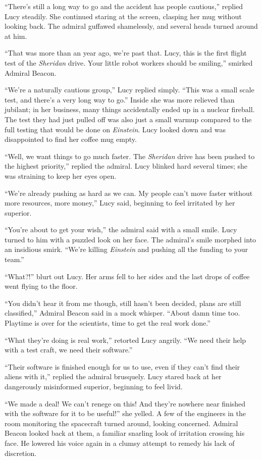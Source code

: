 \documentclass[12pt]{article} %
\begin{document}
``There's still a long way to go and the accident has people cautious,'' replied Lucy steadily. She continued staring at the screen, clasping her mug without looking back. The admiral guffawed shamelessly, and several heads turned around at him.

``That was more than an year ago, we're past that. Lucy, this is the first flight test of the \textit{Sheridan} drive. Your little robot workers should be smiling,'' smirked Admiral Beacon.

``We're a naturally cautious group,'' Lucy replied simply. ``This was a small scale test, and there's a very long way to go.'' Inside she was more relieved than jubilant; in her business, many things accidentally ended up in a nuclear fireball. The test they had just pulled off was also just a small warmup compared to the full testing that would be done on \textit{Einstein}. Lucy looked down and was disappointed to find her coffee mug empty.

``Well, we want things to go much faster. The \textit{Sheridan} drive has been pushed to the highest priority,'' replied the admiral. Lucy blinked hard several times; she was straining to keep her eyes open.

``We're already pushing as hard as we can. My people can't move faster without more resources, more money,'' Lucy said, beginning to feel irritated by her superior.

``You're about to get your wish,'' the admiral said with a small smile. Lucy turned to him with a puzzled look on her face. The admiral's smile morphed into an insidious smirk. ``We're killing \textit{Einstein} and pushing all the funding to your team.''

``What?!'' blurt out Lucy. Her arms fell to her sides and the last drops of coffee went flying to the floor.

``You didn't hear it from me though, still hasn't been decided, plans are still classified,'' Admiral Beacon said in a mock whisper. ``About damn time too. Playtime is over for the scientists, time to get the real work done.''

``What they're doing is real work,'' retorted Lucy angrily. ``We need their help with a test craft, we need their software.''

``Their software is finished enough for us to use, even if they can't find their aliens with it,'' replied the admiral brusquely. Lucy stared back at her dangerously misinformed superior, beginning to feel livid.

``We made a deal! We can't renege on this! And they're nowhere near finished with the software for it to be useful!'' she yelled. A few of the engineers in the room monitoring the spacecraft turned around, looking concerned. Admiral Beacon looked back at them, a familiar snarling look of irritation crossing his face. He lowered his voice again in a clumsy attempt to remedy his lack of discretion.
\end{document}
